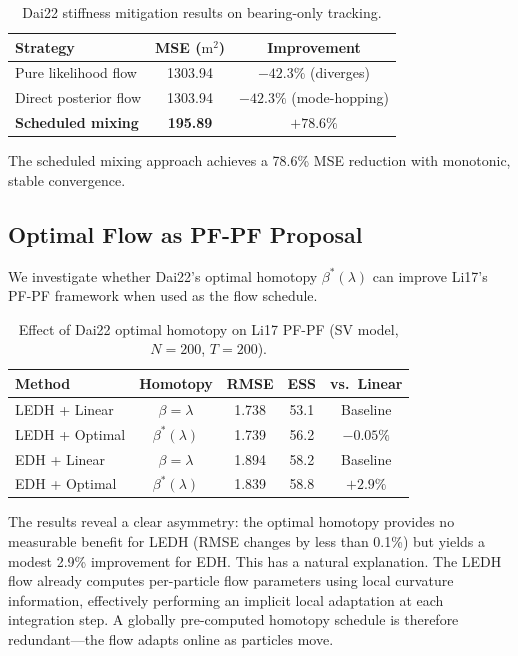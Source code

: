 \documentclass[12pt,a4paper]{article}
\theoremstyle{definition}
\theoremstyle{remark}
\begin{document}
\begin{table}[H]
	\centering
	\caption{Dai22 stiffness mitigation results on bearing-only tracking.}
	\label{tab:dai22}
	\begin{tabular}{@{}lcc@{}}
		\toprule
		\textbf{Strategy} & \textbf{MSE ($\text{m}^2$)} & \textbf{Improvement} \\
		\midrule
		Pure likelihood flow & 1303.94 & $-42.3\%$ (diverges) \\
		Direct posterior flow & 1303.94 & $-42.3\%$ (mode-hopping) \\
		\textbf{Scheduled mixing} & \textbf{195.89} & \textbf{$+78.6\%$} \\
		\bottomrule
	\end{tabular}
\end{table}

The scheduled mixing approach achieves a 78.6\% MSE reduction with monotonic, stable convergence.


\subsection{Optimal Flow as PF-PF Proposal}
\label{sec:dai22-li17}

We investigate whether Dai22's optimal homotopy $\beta^*(\lambda)$ can improve Li17's PF-PF framework when used as the flow schedule.

\begin{table}[H]
	\centering
	\caption{Effect of Dai22 optimal homotopy on Li17 PF-PF (SV model, $N=200$, $T=200$).}
	\label{tab:dai22-li17}
	\begin{tabular}{@{}lcccc@{}}
		\toprule
		\textbf{Method} & \textbf{Homotopy} & \textbf{RMSE} & \textbf{ESS} & \textbf{vs.\ Linear} \\
		\midrule
		LEDH + Linear & $\beta = \lambda$ & 1.738 & 53.1 & Baseline \\
		LEDH + Optimal & $\beta^*(\lambda)$ & 1.739 & 56.2 & $-0.05\%$ \\
		EDH + Linear & $\beta = \lambda$ & 1.894 & 58.2 & Baseline \\
		EDH + Optimal & $\beta^*(\lambda)$ & 1.839 & 58.8 & $+2.9\%$ \\
		\bottomrule
	\end{tabular}
\end{table}

The results reveal a clear asymmetry: the optimal homotopy provides no measurable benefit for LEDH (RMSE changes by less than 0.1\%) but yields a modest 2.9\% improvement for EDH. This has a natural explanation. The LEDH flow already computes per-particle flow parameters using local curvature information, effectively performing an implicit local adaptation at each integration step. A globally pre-computed homotopy schedule is therefore redundant---the flow adapts online as particles move.
\end{document}
